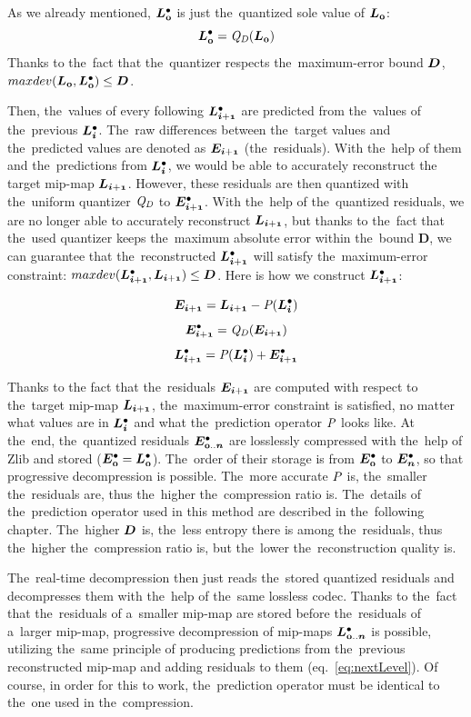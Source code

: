 As we already mentioned, $\ldot{0}$ is just the~quantized sole value of $\lnorm{0}$:
$$\ldot{0} = \dnorm(\lnorm{0})$$
Thanks to the~fact that the~quantizer respects the~maximum-error bound $\objnorm{D}{}$, $maxdev(\lnorm{0}, \ldot{0}) \leq \objnorm{D}{}$.


Then, the~values of every following $\ldot{i+1}$ are predicted from the~values of the~previous $\ldot{i}$. The~raw differences between the~target values and the~predicted values are denoted as $\objnorm{E}{i+1}$ (the~residuals). With the~help of them and the~predictions from $\ldot{i}$, we would be able to accurately reconstruct the target mip-map $\lnorm{i+1}$. However, these residuals are then quantized with the~uniform quantizer $\mathit{Q_{D}}$ to $\objdot{E}{i+1}$. With the~help of the~quantized residuals, we are no longer able to accurately reconstruct $\lnorm{i+1}$, but thanks to the~fact that the~used quantizer keeps the~maximum absolute error within the~bound $\mathbold{D}$, we can guarantee that the~reconstructed $\ldot{i+1}$ will satisfy the~maximum-error constraint: $maxdev(\ldot{i+1}, \lnorm{i+1}) \leq \objnorm{D}{}$. Here is how we construct $\ldot{i+1}$:

$$\objnorm{E}{i+1} = \lnorm{i+1} - \opnorm{P}{}(\ldot{i})$$
$$\objdot{E}{i+1} = \opnorm{Q}{D}(\objnorm{E}{i+1})$$
\begin{equation}
\label{eq:nextLevel}
\ldot{i+1} = \opnorm{P}{}(\ldot{i}) + \objdot{E}{i+1}
\end{equation}

Thanks to the fact that the~residuals $\objnorm{E}{i+1}$ are computed with respect to the~target mip-map $\lnorm{i+1}$, the~maximum-error constraint is satisfied, no matter what values are in $\ldot{i}$ and what the~prediction operator $\mathit{P_{}}$ looks like. At the~end, the~quantized residuals $\objdot{E}{0..n}$ are losslessly compressed with the~help of Zlib and stored ($\objdot{E}{0} = \ldot{0}$). The~order of their storage is from $\objdot{E}{0}$ to $\objdot{E}{n}$, so that progressive decompression is possible. The~more accurate $\mathit{P_{}}$ is, the~smaller the~residuals are, thus the~higher the~compression ratio is. The~details of the~prediction operator used in this method are described in the~following chapter. The~higher $\objnorm{D}{}$ is, the~less entropy there is among the~residuals, thus the~higher the~compression ratio is, but the~lower the~reconstruction quality is.

The~real-time decompression then just reads the~stored quantized residuals and decompresses them with the~help of the~same lossless codec. Thanks to the~fact that the~residuals of a~smaller mip-map are stored before the~residuals of a~larger mip-map, progressive decompression of mip-maps $\ldot{0..n}$ is possible, utilizing the~same principle of producing predictions from the~previous reconstructed mip-map and adding residuals to them (eq.~\ref{eq:nextLevel}). Of course, in order for this to work, the~prediction operator must be identical to the~one used in the~compression.
